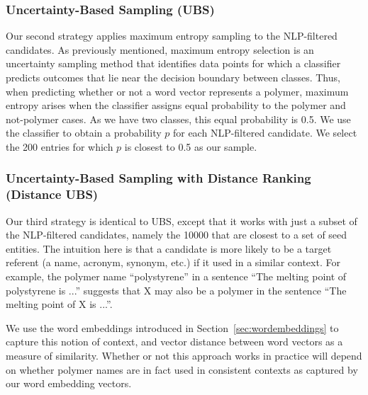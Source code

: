 \subsubsection{Uncertainty-Based Sampling (UBS)}
Our second strategy applies maximum entropy sampling to the NLP-filtered candidates. %
As previously mentioned, maximum entropy selection is an uncertainty sampling method that
identifies data points for which a classifier predicts outcomes that lie near the decision boundary 
between classes. 
Thus, when predicting whether or not a word vector represents a polymer, 
maximum entropy arises when the classifier assigns equal probability to the polymer and not-polymer cases.
As we have two classes, this equal probability is 0.5.
We use the classifier to obtain a probability $p$ for each NLP-filtered candidate. 
We select the 200 entries for which $p$ is closest to 0.5 as our sample.

\subsubsection{Uncertainty-Based Sampling with Distance Ranking (Distance UBS)}
Our third strategy is identical to UBS, except that it works with just a subset of the NLP-filtered candidates,
namely the \num{10000} that are closest to a set of seed entities. 
The intuition here is that a candidate is more likely to be a target referent 
(a name, acronym, synonym, etc.) if it used in a similar context.
For example, the polymer name ``polystyrene'' in a sentence ``The
melting point of polystyrene is ...'' suggests that X may also be a polymer in the
sentence ``The melting point of X is ...''.

We use the word embeddings introduced in Section~\ref{sec:wordembeddings} to capture this notion of context,
and vector distance between word vectors as a measure of similarity.
Whether or not this approach works in practice will depend on whether 
polymer names are in fact used in consistent contexts as captured by our 
word embedding  vectors. 

